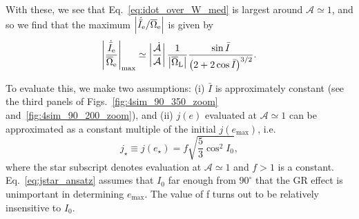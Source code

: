 \documentclass[
        twocolumn,
        twocolappendix
    ]{aastex63}
\newcommand*{\abs}[1]{\left|#1\right|}
\newcommand*{\p}[1]{\left(#1\right)}
\begin{document}
With these, we see that Eq.~\eqref{eq:idot_over_W_med} is largest around
$\mathcal{A} \simeq 1$, and so we find that the maximum $\abs{\dot{\bar{I}}_{\rm
e} / \overline{\Omega}_{\rm e}}$ is given by
\begin{equation}
    \abs{\frac{\dot{\bar{I}}_{\rm e}}{\overline{\Omega}_{\rm e}}}_{\max}
        \simeq \abs{\frac{\dot{\mathcal{A}}}{\mathcal{A}}}
            \frac{1}{\abs{\overline{\Omega}_{\rm L}}}
            \frac{\sin \bar{I}}{\p{2 + 2\cos \bar{I}}^{3/2}}.
            \label{eq:idot_over_W}
\end{equation}

To evaluate this, we make two assumptions: (i) $\bar{I}$ is approximately
constant (see the third panels of Figs.~\ref{fig:4sim_90_350_zoom}
and~\ref{fig:4sim_90_200_zoom}), and (ii) $j(e)$ evaluated at $\mathcal{A}
\simeq 1$ can be approximated as a constant multiple of the initial
$j(e_{\max})$, i.e.
\begin{equation}
    j_{\star} \equiv j(e_{\star}) = f
        \sqrt{\frac{5}{3}\cos^2 I_0},\label{eq:jstar_ansatz}
\end{equation}
where the star subscript denotes evaluation at $\mathcal{A} \simeq 1$ and $f>1$
is a constant. Eq.~\eqref{eq:jstar_ansatz} assumes that $I_0$ far enough from
$90^\circ$ that the GR effect is unimportant in determining $e_{\max}$. The
value of f turns out to be relatively insensitive to $I_0$.
\end{document}
